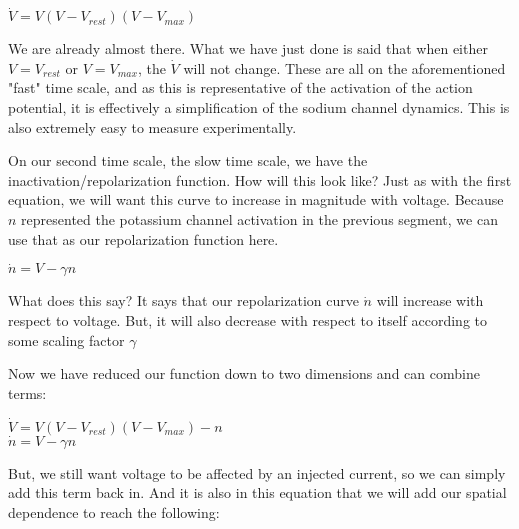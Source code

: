 \documentclass[12pt]{amsart}
\begin{document}
\bigskip

\begin{center}

    $\dot{V} = V(V - V_{rest})(V - V_{max})$
    
\end{center}

\bigskip

We are already almost there. What we have just done is said that when either $V = V_{rest}$ or $V = V_{max}$, the $\dot{V}$ will not change. These are all on the aforementioned "fast" time scale, and as this is representative of the activation of the action potential, it is effectively a simplification of the sodium channel dynamics. This is also extremely easy to measure experimentally.\newline

On our second time scale, the slow time scale, we have the inactivation/repolarization function. How will this look like? Just as with the first equation, we will want this curve to increase in magnitude with voltage. Because $n$ represented the potassium channel activation in the previous segment, we can use that as our repolarization function here. 

\bigskip

\begin{center}

    $\dot{n} = V - \gamma n$
    
\end{center}

\bigskip

What does this say? It says that our repolarization curve $\dot{n}$ will increase with respect to voltage. But, it will also decrease with respect to itself according to some scaling factor $\gamma$\newline

Now we have reduced our function down to two dimensions and can combine terms: 

\bigskip

\begin{center}

    $\dot{V} = V(V - V_{rest})(V - V_{max}) - n$\\
    $\dot{n} = V - \gamma n$
    
\end{center}

\bigskip

But, we still want voltage to be affected by an injected current, so we can simply add this term back in. And it is also in this equation that we will add our spatial dependence to reach the following: 
\end{document}

